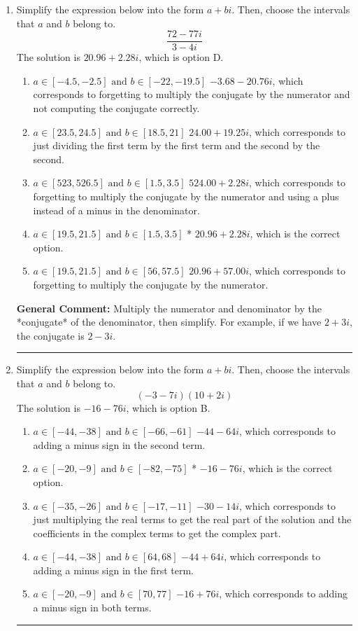 \documentclass{extbook}[14pt]
\newcommand{\litem}[1]{\item #1

\rule{\textwidth}{0.4pt}}
\begin{document}
\begin{enumerate}
{ Irrational numbers are more than just square root of 3: adding or subtracting values from square root of 3 is also irrational.
}
\litem{
Simplify the expression below into the form $a+bi$. Then, choose the intervals that $a$ and $b$ belong to.
\[ \frac{72 - 77 i}{3 - 4 i} \]
The solution is \( 20.96  + 2.28 i \), which is option D.\begin{enumerate}[label=\Alph*.]
\item \( a \in [-4.5, -2.5] \text{ and } b \in [-22, -19.5] \)
 $-3.68  - 20.76 i$, which corresponds to forgetting to multiply the conjugate by the numerator and not computing the conjugate correctly.
\item \( a \in [23.5, 24.5] \text{ and } b \in [18.5, 21] \)
 $24.00  + 19.25 i$, which corresponds to just dividing the first term by the first term and the second by the second.
\item \( a \in [523, 526.5] \text{ and } b \in [1.5, 3.5] \)
 $524.00  + 2.28 i$, which corresponds to forgetting to multiply the conjugate by the numerator and using a plus instead of a minus in the denominator.
\item \( a \in [19.5, 21.5] \text{ and } b \in [1.5, 3.5] \)
* $20.96  + 2.28 i$, which is the correct option.
\item \( a \in [19.5, 21.5] \text{ and } b \in [56, 57.5] \)
 $20.96  + 57.00 i$, which corresponds to forgetting to multiply the conjugate by the numerator.
\end{enumerate}

\textbf{General Comment:} Multiply the numerator and denominator by the *conjugate* of the denominator, then simplify. For example, if we have $2+3i$, the conjugate is $2-3i$.
}
\litem{
Simplify the expression below into the form $a+bi$. Then, choose the intervals that $a$ and $b$ belong to.
\[ (-3 - 7 i)(10 + 2 i) \]
The solution is \( -16 - 76 i \), which is option B.\begin{enumerate}[label=\Alph*.]
\item \( a \in [-44, -38] \text{ and } b \in [-66, -61] \)
 $-44 - 64 i$, which corresponds to adding a minus sign in the second term.
\item \( a \in [-20, -9] \text{ and } b \in [-82, -75] \)
* $-16 - 76 i$, which is the correct option.
\item \( a \in [-35, -26] \text{ and } b \in [-17, -11] \)
 $-30 - 14 i$, which corresponds to just multiplying the real terms to get the real part of the solution and the coefficients in the complex terms to get the complex part.
\item \( a \in [-44, -38] \text{ and } b \in [64, 68] \)
 $-44 + 64 i$, which corresponds to adding a minus sign in the first term.
\item \( a \in [-20, -9] \text{ and } b \in [70, 77] \)
 $-16 + 76 i$, which corresponds to adding a minus sign in both terms.
\end{enumerate}

}
\end{enumerate}
\end{document}
